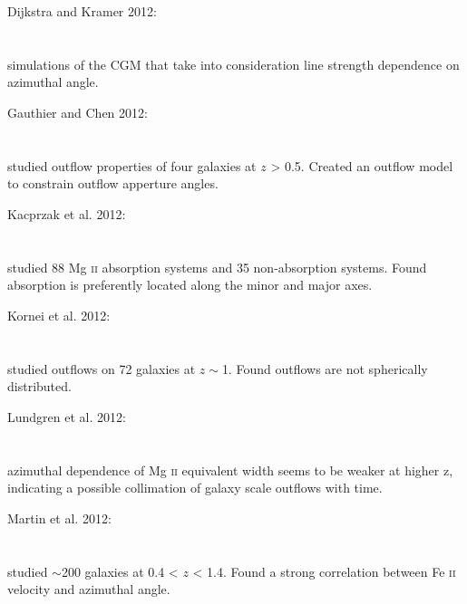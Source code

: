 \hline

Dijkstra and Kramer 2012: \\
\citet{2012MNRAS.424.1672D} \\
\citep{2012MNRAS.424.1672D} \\
simulations of the CGM that take into consideration line strength dependence on
azimuthal angle. \\

\hline

Gauthier and Chen 2012: \\
\citet{2012MNRAS.424.1952G} \\
\citep{2012MNRAS.424.1952G} \\
studied outflow properties of four galaxies at $z$ > 0.5. Created an outflow
model to constrain outflow apperture angles. \\

\hline

Kacprzak et al. 2012: \\
\citet{2012ApJ...760L...7K} \\
\citep{2012ApJ...760L...7K} \\
studied 88 Mg \textsc{ii} absorption systems and 35 non-absorption systems.
Found absorption is preferently located along the minor and major axes. \\

\hline

Kornei et al. 2012: \\
\citet{2012ApJ...758..135K} \\
\citep{2012ApJ...758..135K} \\
studied outflows on 72 galaxies at $z\sim$1. Found outflows are not spherically
distributed. \\

\hline

Lundgren et al. 2012: \\
\citet{2012ApJ...760...49L} \\
\citep{2012ApJ...760...49L} \\
azimuthal dependence of Mg \textsc{ii} equivalent width seems to be weaker at
higher z, indicating a possible collimation of galaxy scale outflows with time.
\\

\hline

Martin et al. 2012: \\
\citet{2012ApJ...760..127M} \\
\citep{2012ApJ...760..127M} \\
studied $\sim$200 galaxies at 0.4 < $z$ < 1.4. Found a strong correlation
between Fe \textsc{ii} velocity and azimuthal angle. \\

